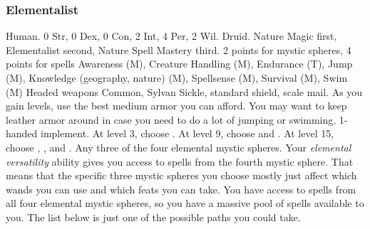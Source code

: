         \subsubsection{Elementalist}
             Human.
             0 Str, 0 Dex, 0 Con, 2 Int, 4 Per, 2 Wil.
             Druid.
             Nature Magic first, Elementalist second, Nature Spell Mastery third.
             2 points for mystic spheres, 4 points for spells
             Awareness (M), Creature Handling (M), Endurance (T), Jump (M), Knowledge (geography, nature) (M), Spellsense (M), Survival (M), Swim (M)
             Headed weapons
             Common, Sylvan
             Sickle, standard shield, scale mail. As you gain levels, use the best medium armor you can afford.
            You may want to keep leather armor around in case you need to do a lot of jumping or swimming.
             1-handed implement.
                At level 3, choose .
                At level 9, choose  and .
                At level 15, choose , , and .
             Any three of the four elemental mystic spheres.
            Your \textit{elemental versatility} ability gives you access to spells from the fourth mystic sphere.
            That means that the specific three mystic spheres you choose mostly just affect which wands you can use and which feats you can take.
            You have access to spells from all four elemental mystic spheres, so you have a massive pool of spells available to you.
            The list below is just one of the possible paths you could take.
